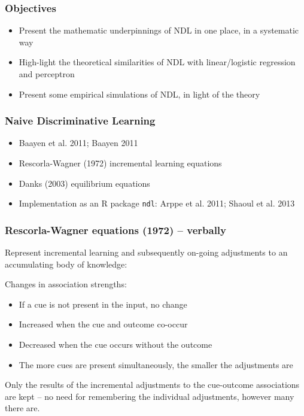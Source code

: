 \begin{frame}
  \frametitle{Objectives}

  \begin{itemize}

  \item Present the mathematic underpinnings of NDL in one place, in a systematic way

  \item High-light the theoretical similarities of NDL with linear/logistic regression and perceptron

  \item Present some empirical simulations of NDL, in light of the theory
    
  \end{itemize}
  
\end{frame}

\begin{frame}
  \frametitle{Naive Discriminative Learning}
  
  \begin{itemize}
  
  \item Baayen et al. 2011; Baayen 2011

  \item Rescorla-Wagner (1972) incremental learning equations

  \item Danks (2003) equilibrium equations

  \item Implementation as an R package \texttt{ndl}: Arppe et
    al. 2011; Shaoul et al. 2013

\end{itemize}    

\end{frame}

\begin{frame}
\frametitle{Rescorla-Wagner equations (1972) -- verbally}

Represent incremental learning and subsequently on-going adjustments
to an accumulating body of knowledge:

Changes in association strengths:
\begin{itemize}
	\item If a cue is not present in the input, no change
	\item Increased when the cue and outcome co-occur
	\item Decreased when the cue occurs without the outcome
	\item The more cues are present simultaneously, the smaller the adjustments are 
\end{itemize}

Only the results of the incremental adjustments to the cue-outcome
associations are kept -- no need for remembering the individual
adjustments, however many there are.

\end{frame}

